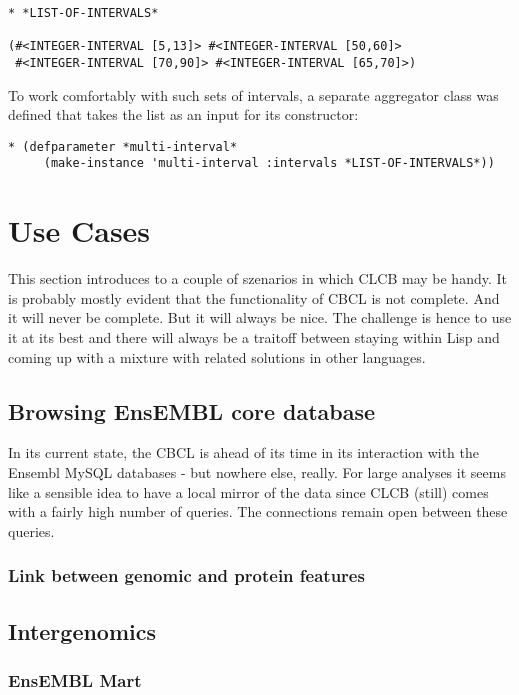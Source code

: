 \documentclass{book}
\newcommand\ensembl{EnsEMBL }
\newcommand\CLCB{CLCB }
\begin{document}
\begin{lstlisting}
* *LIST-OF-INTERVALS*

(#<INTEGER-INTERVAL [5,13]> #<INTEGER-INTERVAL [50,60]>
 #<INTEGER-INTERVAL [70,90]> #<INTEGER-INTERVAL [65,70]>)
\end{lstlisting}

To work comfortably with such sets of intervals, a separate
aggregator class was defined that takes the list as an input
for its constructor:

\begin{lstlisting}
* (defparameter *multi-interval*
     (make-instance 'multi-interval :intervals *LIST-OF-INTERVALS*))
\end{lstlisting}



\chapter{Use Cases}

This section introduces to a couple of szenarios in which \CLCB may
be handy. It is probably mostly evident that the functionality of CBCL
is not complete. And it will never be complete. But it will always be
nice. The challenge is hence to use it at its best and there will always
be a traitoff between staying within Lisp and coming up with a mixture
with related solutions in other languages.

\section{Browsing \ensembl core database}

In its current state, the CBCL is ahead of its time in its interaction with
the Ensembl MySQL databases - but nowhere else, really. For large analyses
it seems like a sensible idea to have a local mirror of the data since
\CLCB (still) comes with a fairly high number of queries. The connections
remain open between these queries.

\subsection{Link between genomic and protein features}

\section{Intergenomics}

\subsection{\ensembl Mart}
\end{document}

